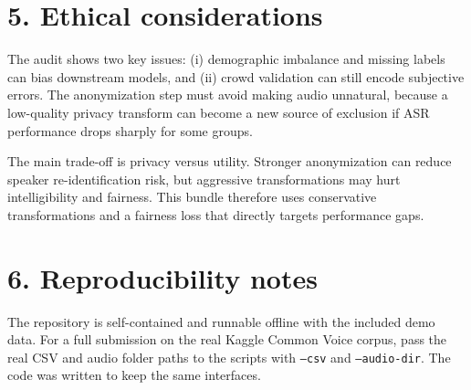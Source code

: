 \documentclass[10pt]{article}
\begin{document}
\section*{5. Ethical considerations}
The audit shows two key issues: (i) demographic imbalance and missing labels can bias downstream models, and (ii) crowd validation can still encode subjective errors. The anonymization step must avoid making audio unnatural, because a low-quality privacy transform can become a new source of exclusion if ASR performance drops sharply for some groups.

The main trade-off is privacy versus utility. Stronger anonymization can reduce speaker re-identification risk, but aggressive transformations may hurt intelligibility and fairness. This bundle therefore uses conservative transformations and a fairness loss that directly targets performance gaps.

\section*{6. Reproducibility notes}
The repository is self-contained and runnable offline with the included demo data. For a full submission on the real Kaggle Common Voice corpus, pass the real CSV and audio folder paths to the scripts with \texttt{--csv} and \texttt{--audio-dir}. The code was written to keep the same interfaces.
\end{document}
